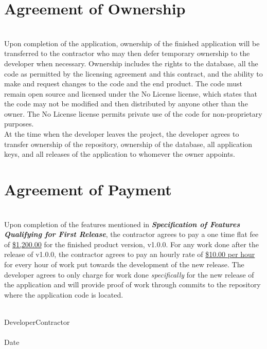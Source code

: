 \documentclass{article}
\begin{document}
\section{Agreement of Ownership}
\noindent\\
\indent Upon completion of the application, ownership of the finished application will be transferred to the contractor who may then defer temporary ownership to the developer when necessary.
Ownership includes the rights to the database, all the code as permitted by the licensing agreement and this contract, and the ability to make and request changes to the code and the end product.
The code must remain open source and licensed under the No License license, which states that the code may not be modified and then distributed by anyone other than the owner.
The No License license permits private use of the code for non-proprietary purposes.\\
\indent At the time when the developer leaves the project, the developer agrees to transfer ownership of the repository, ownership of the database, all application keys, and all releases of the application to whomever the owner appoints.
\vspace{1cm}
\section{Agreement of Payment}
\noindent\\
\indent Upon completion of the features mentioned in \textbf{\textit{Specification of Features Qualifying for First Release}}, the contractor agrees to pay a one time flat fee of \underline{\hspace{1em}\$1,200.00\hspace{1em}} for the finished product version, v1.0.0.
For any work done after the release of v1.0.0, the contractor agrees to pay an hourly rate of \underline{\hspace{1em}\$10.00 per hour\hspace{1em}} for every hour of work put towards the development of the new release.
The developer agrees to only charge for work done \textit{specifically} for the new release of the application and will provide proof of work through commits to the repository where the application code is located.

\vspace{4cm}
\underline{\hspace{15em}} \hspace{4em} \underline{\hspace{15em}}\\

\hspace{1em}Developer\hspace{15em}Contractor\\

\underline{\hspace{15em}}\\

\hspace{1em}Date
\end{document}
